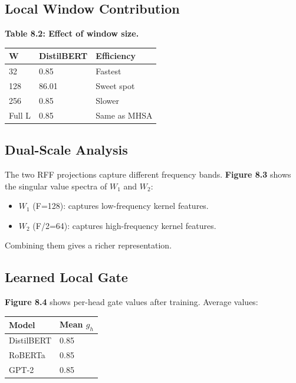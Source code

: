 \subsection{Local Window Contribution}

\textbf{Table 8.2: Effect of window size.}

\begin{table}[H]
\centering
\small
\begin{tabular}{lll}
\toprule
\textbf{W} & \textbf{DistilBERT} & \textbf{Efficiency} \\
\midrule
32 & 0.85 & Fastest \\
128 & 86.01 & Sweet spot \\
256 & 0.85 & Slower \\
Full L & 0.85 & Same as MHSA \\
\bottomrule
\end{tabular}
\end{table}

\subsection{Dual-Scale Analysis}

The two RFF projections capture different frequency bands. \textbf{Figure 8.3} 
shows the singular value spectra of $W_1$ and $W_2$:

\begin{itemize}
\item $W_1$ (F=128): captures low-frequency kernel features.
\item $W_2$ (F/2=64): captures high-frequency kernel features.

\end{itemize}
Combining them gives a richer representation.

\subsection{Learned Local Gate}

\textbf{Figure 8.4} shows per-head gate values after training. Average values:

\begin{table}[H]
\centering
\small
\begin{tabular}{ll}
\toprule
\textbf{Model} & \textbf{Mean $g_h$} \\
\midrule
DistilBERT & 0.85 \\
RoBERTa & 0.85 \\
GPT-2 & 0.85 \\
\bottomrule
\end{tabular}
\end{table}

